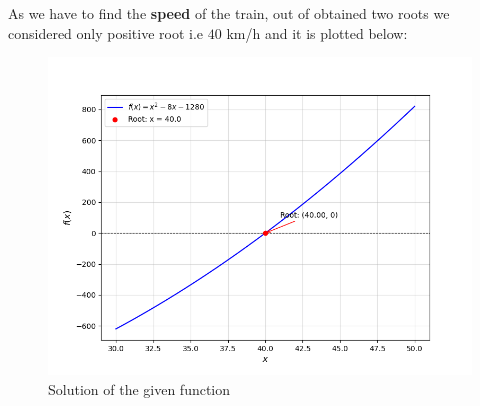 \documentclass[journal]{IEEEtran}
\begin{document}
As we have to find the \textbf{speed} of the train, out of obtained two roots we considered only positive root i.e $40$ km/h and it is plotted below:
\begin{figure}[!ht]
		\centering
		\includegraphics[width=\columnwidth]{figs/Figure_1.png}
		\caption{Solution of the given function}
		\label{stemplot}
	\end{figure}
\end{document}
